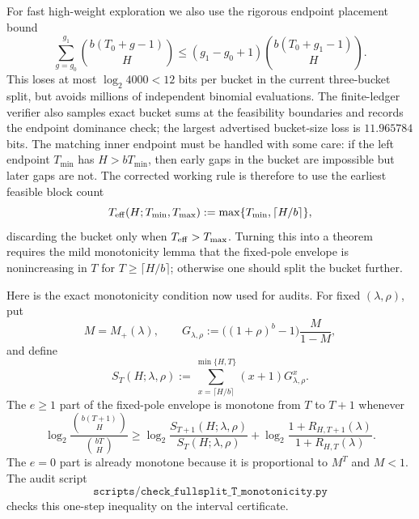 For fast high-weight exploration we also use the rigorous endpoint placement bound
\[
\sum_{g=g_0}^{g_1}\binom{b(T_0+g-1)}{H}
\le
(g_1-g_0+1)\binom{b(T_0+g_1-1)}{H}.
\]
This loses at most \(\log_2 4000<12\) bits per bucket in the current three-bucket split, but avoids millions of
independent binomial evaluations.  The finite-ledger verifier also samples exact bucket sums at the feasibility
boundaries and records the endpoint dominance check; the largest advertised bucket-size loss is \(11.965784\) bits.
The matching inner endpoint must be handled with some care: if the left endpoint \(T_{\min}\) has \(H>bT_{\min}\),
then early gaps in the bucket are impossible but later gaps are not.  The corrected working rule is therefore to use
the earliest feasible block count
\[
T_{\rm eff}(H;T_{\min},T_{\max})
:=\max\{T_{\min},\lceil H/b\rceil\},
\]
discarding the bucket only when \(T_{\rm eff}>T_{\max}\).  Turning this into a theorem requires the mild monotonicity
lemma that the fixed-pole envelope is nonincreasing in \(T\) for \(T\ge \lceil H/b\rceil\); otherwise one should split
the bucket further.

Here is the exact monotonicity condition now used for audits.  For fixed \((\lambda,\rho)\), put
\[
M=M_+(\lambda),\qquad
G_{\lambda,\rho}:=
\big((1+\rho)^b-1\big)\frac{M}{1-M},
\]
and define
\[
S_T(H;\lambda,\rho):=
\sum_{x=\lceil H/b\rceil}^{\min\{H,T\}}(x+1)G_{\lambda,\rho}^x.
\]
The \(e\ge1\) part of the fixed-pole envelope is monotone from \(T\) to \(T+1\) whenever
\[
\log_2\frac{\binom{b(T+1)}{H}}{\binom{bT}{H}}
\ge
\log_2\frac{S_{T+1}(H;\lambda,\rho)}{S_T(H;\lambda,\rho)}
+
\log_2\frac{1+R_{H,T+1}(\lambda)}{1+R_{H,T}(\lambda)}.
\]
The \(e=0\) part is already monotone because it is proportional to \(M^T\) and \(M<1\).  The audit script
\[
\texttt{scripts/check\_fullsplit\_T\_monotonicity.py}
\]
checks this one-step inequality on the interval certificate.


